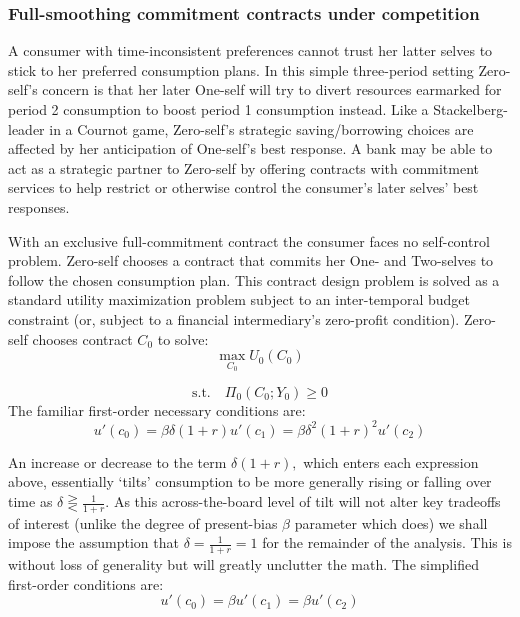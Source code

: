 \documentclass[11pt,english]{article}
\theoremstyle{plain}
\theoremstyle{definition}
\begin{document}
\subsubsection{Full-smoothing commitment contracts under competition}

\label{sec-FCC} A consumer with time-inconsistent preferences cannot
trust her latter selves to stick to her preferred consumption plans.
In this simple three-period setting Zero-self's concern is that her
later One-self will try to divert resources earmarked for period 2
consumption to boost period 1 consumption instead. Like a Stackelberg-leader
in a Cournot game, Zero-self's strategic saving/borrowing choices
are affected by her anticipation of One-self's best response. A bank
may be able to act as a strategic partner to Zero-self by offering
contracts with commitment services to help restrict or otherwise control
the consumer's later selves' best responses.

With an exclusive full-commitment contract the consumer faces no self-control
problem. Zero-self chooses a contract that commits her One- and Two-selves
to follow the chosen consumption plan. This contract design problem
is solved as a standard utility maximization problem subject to an
inter-temporal budget constraint (or, subject to a financial intermediary's
zero-profit condition). Zero-self chooses contract $C_{0}$ to solve:
\begin{equation}
\max_{C_{0}}U_{0}(C_{0})\label{eq:cobj0}
\end{equation}

\begin{equation}
\text{s.t.}\quad\Pi_{0}(C_{0};Y_{0})\geq0\label{eq:BPC0}
\end{equation}
The familiar first-order necessary conditions are: 
\begin{equation}
u'\left(c_{0}\right)=\beta\delta(1+r)u'\left(c_{1}\right)=\beta\delta^{2}(1+r)^{2}u'\left(c_{2}\right)
\end{equation}

An increase or decrease to the term $\delta(1+r),$ which enters each
expression above, essentially `tilts' consumption to be more generally
rising or falling over time as $\delta\gtreqless\frac{1}{1+r}$. As
this across-the-board level of tilt will not alter key tradeoffs of
interest (unlike the degree of present-bias $\beta$ parameter which
does) we shall impose the assumption that $\delta=\frac{1}{1+r}=1$
for the remainder of the analysis. This is without loss of generality
but will greatly unclutter the math. The simplified first-order conditions
are: 
\begin{equation}
u'\left(c_{0}\right)=\beta u'\left(c_{1}\right)=\beta u'\left(c_{2}\right)\label{eq:FOC_comp}
\end{equation}
\end{document}
